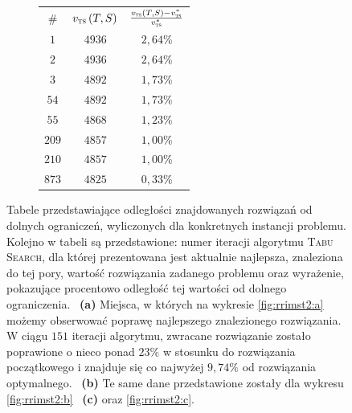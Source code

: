 \begin{figure}[!htbp]
\begin{subfigure}[b]{0.3\textwidth}
\begin{tabular}{ccc}
			\# & $v_{\textsc{ts}} \left( T, S \right)$ & $\frac{v_{\textsc{ts}} \left( T, S \right) - v_{\textsc{ts}}^{\ast}}{v_{\textsc{ts}}^{\ast}}$ \\
			$1$	&	$4936$	&	$2,64$\%	\\
			$2$	&	$4936$	&	$2,64$\%	\\
			$3$	&	$4892$	&	$1,73$\%	\\
			$54$	&	$4892$	&	$1,73$\%	\\
			$55$	&	$4868$	&	$1,23$\%	\\
			$209$	&	$4857$	&	$1,00$\%	\\
			$210$	&	$4857$	&	$1,00$\%	\\
			$873$	&	$4825$	&	$0,33$\%	\\\hline                                                                                                     
		\end{tabular}
		\caption{}
		\label{fig:rrimst2tab:c}
	\end{subfigure}
	\hfill\null
	\caption{
		Tabele przedstawiające odległości znajdowanych rozwiązań od dolnych ograniczeń, wyliczonych dla konkretnych instancji problemu. Kolejno w tabeli są przedstawione: numer iteracji algorytmu \textsc{Tabu Search}, dla której prezentowana jest aktualnie najlepsza, znaleziona do tej pory, wartość rozwiązania zadanego problemu oraz wyrażenie, pokazujące procentowo odległość tej wartości od dolnego ograniczenia.
		~\textbf{(a)} Miejsca, w których na wykresie \ref{fig:rrimst2:a} możemy obserwować poprawę najlepszego znalezionego rozwiązania. W ciągu $151$ iteracji algorytmu, zwracane rozwiązanie zostało poprawione o nieco ponad $23\%$ w stosunku do rozwiązania początkowego i znajduje się co najwyżej $9,74\%$ od rozwiązania optymalnego.
		~\textbf{(b)} Te same dane przedstawione zostały dla wykresu \ref{fig:rrimst2:b}
		~\textbf{(c)} oraz \ref{fig:rrimst2:c}.
	}
	\label{fig:rrimst2tab}
\end{figure}


